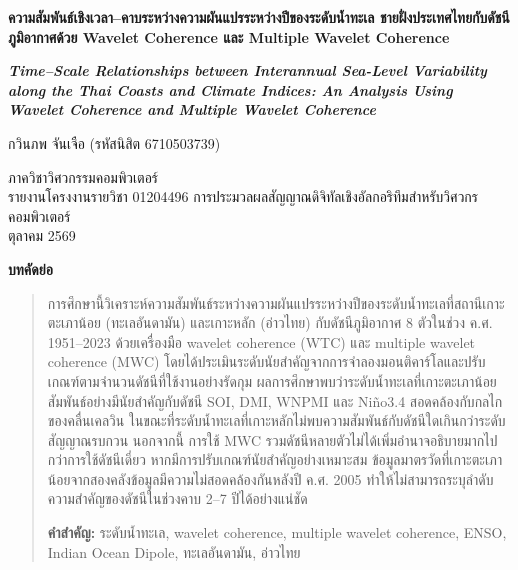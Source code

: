 \documentclass[a4paper,11pt]{article}
\begin{document}
\begin{center}
{\LARGE\bfseries ความสัมพันธ์เชิงเวลา–คาบระหว่างความผันแปรระหว่างปีของระดับน้ำทะเล%
ชายฝั่งประเทศไทยกับดัชนีภูมิอากาศด้วย Wavelet Coherence และ Multiple Wavelet Coherence\par}
\vspace{0.8em}
{\large\bfseries\itshape Time–Scale Relationships between Interannual Sea-Level Variability along the Thai Coasts
and Climate Indices: An Analysis Using Wavelet Coherence and Multiple Wavelet Coherence\par}
\vspace{1.2em}
{\large กวินภพ จันเจือ (รหัสนิสิต 6710503739)\par}
\vspace{0.3em}
{\small ภาควิชาวิศวกรรมคอมพิวเตอร์\\
รายงานโครงงานรายวิชา 01204496 การประมวลผลสัญญาณดิจิทัลเชิงอัลกอริทึมสำหรับวิศวกรคอมพิวเตอร์\\
ตุลาคม 2569\par}
\end{center}

\vspace{0.6em}
\begin{center}\bfseries บทคัดย่อ\end{center}
\vspace{-0.6em}
\begin{quote}\small
การศึกษานี้วิเคราะห์ความสัมพันธ์ระหว่างความผันแปรระหว่างปีของระดับน้ำทะเลที่สถานีเกาะตะเภาน้อย (ทะเลอันดามัน)
และเกาะหลัก (อ่าวไทย) กับดัชนีภูมิอากาศ 8 ตัวในช่วง ค.ศ. 1951–2023 ด้วยเครื่องมือ wavelet coherence (WTC)
และ multiple wavelet coherence (MWC) โดยได้ประเมินระดับนัยสำคัญจากการจำลองมอนติคาร์โลและปรับเกณฑ์ตามจำนวนดัชนีที่ใช้งานอย่างรัดกุม
ผลการศึกษาพบว่าระดับน้ำทะเลที่เกาะตะเภาน้อยสัมพันธ์อย่างมีนัยสำคัญกับดัชนี SOI, DMI, WNPMI และ Niño3.4
สอดคล้องกับกลไกของคลื่นเคลวิน ในขณะที่ระดับน้ำทะเลที่เกาะหลักไม่พบความสัมพันธ์กับดัชนีใดเกินกว่าระดับสัญญาณรบกวน
นอกจากนี้ การใช้ MWC รวมดัชนีหลายตัวไม่ได้เพิ่มอำนาจอธิบายมากไปกว่าการใช้ดัชนีเดี่ยว หากมีการปรับเกณฑ์นัยสำคัญอย่างเหมาะสม
ข้อมูลมาตรวัดที่เกาะตะเภาน้อยจากสองคลังข้อมูลมีความไม่สอดคล้องกันหลังปี ค.ศ. 2005
ทำให้ไม่สามารถระบุลำดับความสำคัญของดัชนีในช่วงคาบ 2–7 ปีได้อย่างแน่ชัด

\vspace{0.5em}
\noindent\textbf{คำสำคัญ:} ระดับน้ำทะเล, wavelet coherence, multiple wavelet coherence, ENSO, Indian Ocean Dipole,
ทะเลอันดามัน, อ่าวไทย
\end{quote}
\vspace{0.5em}
\end{document}
